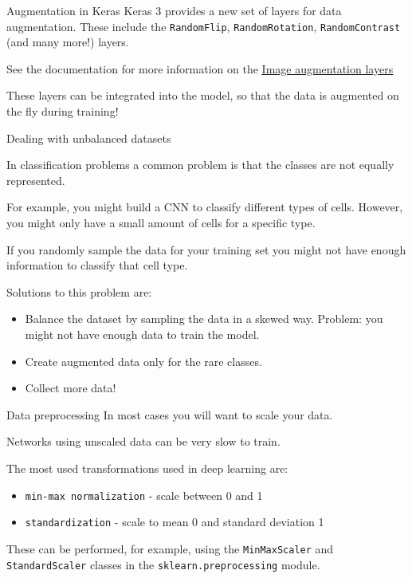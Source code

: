 \documentclass[9pt, aspectratio=169]{beamer}
\begin{document}
\begin{frame}
    {Augmentation in Keras}
    Keras 3 provides a new set of layers for data augmentation.
    These include the \texttt{RandomFlip}, \texttt{RandomRotation}, \texttt{RandomContrast} (and many more!) layers.

    See the documentation for more information on the \href{https://keras.io/api/layers/preprocessing_layers/image_augmentation/}{\underline{Image augmentation layers}}

    \pause
    These layers can be integrated into the model, so that the data is augmented on the fly during training!
\end{frame}

\begin{frame}
    {Dealing with unbalanced datasets}

    In classification problems a common problem is that the classes are not equally represented.

    For example, you might build a CNN to classify different types of cells. However, you might only have a small amount of cells for a specific type.

    If you randomly sample the data for your training set you might not have enough information to classify that cell type.

    Solutions to this problem are:

    \begin{itemize}
        \item Balance the dataset by sampling the data in a skewed way. Problem: you might not have enough data to train the model.
        \item Create augmented data only for the rare classes.
        \item Collect more data!
    \end{itemize}
\end{frame}

\begin{frame}
    {Data preprocessing}
    In most cases you will want to scale your data.

    Networks using unscaled data can be very slow to train.

    The most used transformations used in deep learning are:

    \begin{itemize}
        \item \texttt{min-max normalization} - scale between 0 and 1
        \item \texttt{standardization} - scale to mean 0 and standard deviation 1
    \end{itemize}

    These can be performed, for example, using the \texttt{MinMaxScaler} and \texttt{StandardScaler} classes in the \texttt{sklearn.preprocessing} module.
\end{frame}
\end{document}
